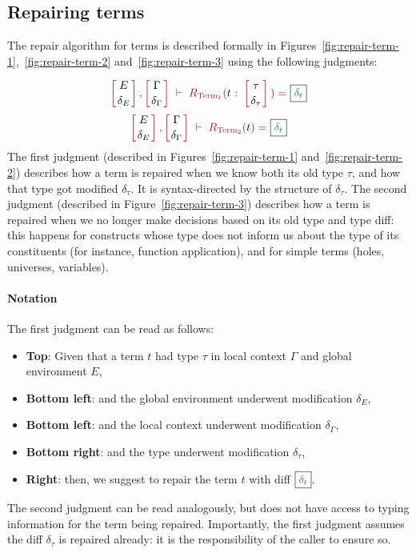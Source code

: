 \subsection{Repairing terms}\label{chick-design-repair-term}

The repair algorithm for terms is described formally in
Figures~\ref{fig:repair-term-1},~\ref{fig:repair-term-2}
and~\ref{fig:repair-term-3} using the following judgments:

{
  \[
    {\turnstile
      { \dcontext{E}{\delta_E}{\Gamma}{\delta_\Gamma} }
      {\repair{t}{\delta_t}{\tau}{\delta_\tau}}
    }
  \]
  \[
    {\turnstile
      { \dcontext{E}{\delta_E}{\Gamma}{\delta_\Gamma} }
      {\repairTermWithoutType{t}{\delta_t}}
    }
  \]
}%
%
The first judgment (described in Figures~\ref{fig:repair-term-1}
and~\ref{fig:repair-term-2}) describes how a term is repaired when we know both
its old type $\tau$, and how that type got modified $\delta_\tau$.  It is
syntax-directed by the structure of $\delta_\tau$.  The second judgment
(described in Figure~\ref{fig:repair-term-3}) describes how a term is repaired
when we no longer make decisions based on its old type and type diff: this
happens for constructs whose type does not inform us about the type of its
constituents (for instance, function application), and for simple terms (holes,
universes, variables).

\paragraph{Notation} The first judgment can be read as follows:

\begin{itemize}

  \item \textbf{Top}: Given that a term $t$ had type $\tau$ in local context
$\Gamma$ and global environment $E$,

  \item \textbf{Bottom left}: and the global environment underwent modification
$\delta_{E}$,

  \item \textbf{Bottom left}: and the local context underwent modification
$\delta_{\Gamma}$,

  \item \textbf{Bottom right}: and the type underwent modification
$\delta_{\tau}$,

  \item \textbf{Right}: then, we suggest to repair the term $t$ with diff
$\boxed{ \textcolor{teal}{\delta_{t}} }$.

\end{itemize}

\noindent The second judgment can be read analogously, but does not have access
to typing information for the term being repaired.  Importantly, the first
judgment assumes the diff $\delta_\tau$ is repaired already: it is the
responsibility of the caller to ensure so.




